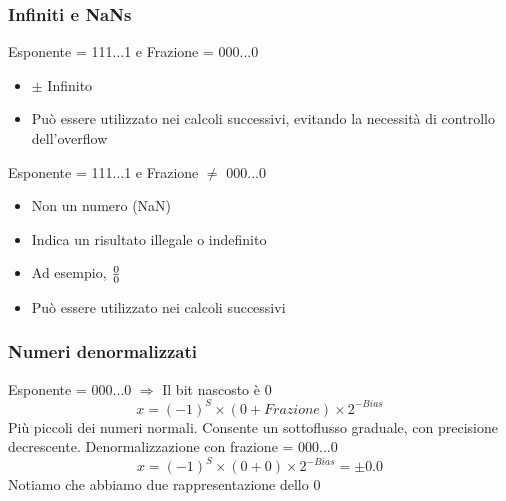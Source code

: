 \documentclass[12pt,a4paper]{article}
\begin{document}
\subsubsection{Infiniti e NaNs}
Esponente = 111...1 e Frazione = 000...0
\begin{itemize}
\item $\pm$ Infinito
\item Può essere utilizzato nei calcoli successivi, evitando la necessità di controllo dell'overflow
\end{itemize}
 Esponente = 111...1 e Frazione $\not =$ 000...0
\begin{itemize}
\item Non un numero (NaN)
\item Indica un risultato illegale o indefinito
\item Ad esempio, $0 \over 0$
\item Può essere utilizzato nei calcoli successivi
\end{itemize}

\subsubsection{Numeri denormalizzati}
Esponente = 000...0 $\Rightarrow$ Il bit nascosto è 0
$$x = (-1)^S\times (0+Frazione)\times 2^{-Bias}$$
Più piccoli dei numeri normali. Consente un sottoflusso graduale, con precisione decrescente. Denormalizzazione con frazione = 000...0
$$x=(-1)^S\times (0+0)\times 2^{-Bias} = \pm 0.0$$
Notiamo che abbiamo due rappresentazione dello 0
\end{document}
